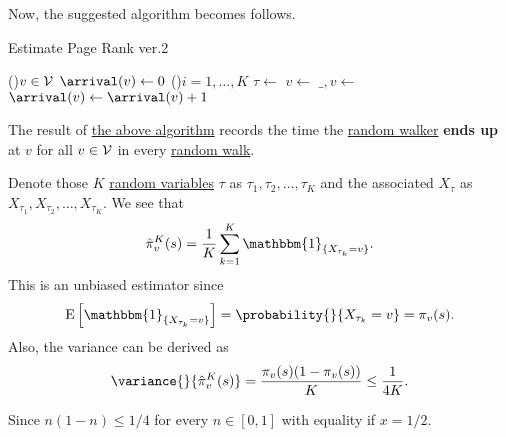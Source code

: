 Now, the suggested algorithm becomes follows.
\par
\begin{algorithm}[H]\label{algo:Monte-Carlo-algorithm-2}
	\DontPrintSemicolon
	\caption{Estimate Page Rank ver.2}

	\BlankLine

	\For(){\(v\in \mathcal{\MakeUppercase{v}} \)}{
		\(\arrival(v)\gets 0\)\;
	}
	\;
	\For(){\(i = 1, \ldots, K\)}{
		\(\tau \gets \) 
		\(v\gets \)
		\(\_, v\gets\)
		\(\arrival(v)\gets \arrival(v) + 1\)
	}
	\Return{\arrival}\;
\end{algorithm}
\begin{note}
	The result of \hyperref[algo:Monte-Carlo-algorithm-2]{the above algorithm} records the time the \hyperref[def:random-walker]{random walker}
	\textbf{ends up} at \(v\) for all \(v\in \mathcal{\MakeUppercase{v}} \) in every \hyperref[algo:random-walk-algorithm]{random walk}.
\end{note}

Denote those \(K\) \hyperref[def:random-variable]{random variables} \(\tau\) as \(\tau_1, \tau_2, \ldots , \tau_K\)
and the associated \(X_{\tau}\) as \(X_{\tau_1}, X_{\tau_2}, \ldots , X_{\tau_K}\). We see that
\[
	\hat{\pi}_v^K(s) = \frac{1}{K}\sum\limits_{k=1}^{K} \mathbbm{1}_{\{X_{\tau_k} = v\}}.
\]
This is an unbiased estimator since
\[
	\mathrm{E}\left[\mathbbm{1}_{\{X_{\tau_k}=v\}}\right] = \probability{}{X_{\tau_k} = v} = \pi_v(s).
\]
Also, the variance can be derived as
\[
	\variance{}{\hat{\pi}_v^K(s)} = \frac{\pi_v(s)(1 - \pi_v(s))}{K}\leq \frac{1}{4K}.
\]

\begin{remark}
	Since \(n(1-n)\leq 1/4\) for every \(n\in[0, 1]\) with equality if \(x = 1/2\).
\end{remark}

